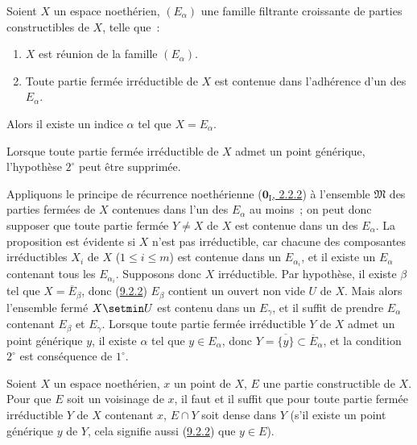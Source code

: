 \begin{corollary}[9.2.4]
\label{0.9.2.4-fr}
Soient $X$ un espace noethérien, $(E_\alpha)$ une famille filtrante
croissante de parties constructibles de $X$, telle que~:
\begin{enumerate}
  \item[$1^\circ$] $X$ est réunion de la famille $(E_\alpha)$.
  \item[$2^\circ$] Toute partie fermée irréductible de $X$ est contenue dans
    l'adhérence d'un des $E_\alpha$.
\end{enumerate}
Alors il existe un indice $\alpha$ tel que $X=E_\alpha$.

Lorsque toute partie fermée irréductible de $X$ admet un point générique,
l'hypothèse $2^\circ$ peut être supprimée.
\end{corollary}

Appliquons le principe de récurrence noethérienne
(\hyperref[0.2.2.2-fr]{$\mathbf{0}_{\mathrm I}$, 2.2.2}) à l'ensemble
$\mathfrak{M}$ des parties fermées de $X$ contenues dans l'un des $E_\alpha$
au moins~; on peut donc supposer que toute partie fermée $Y\ne X$ de $X$ est
contenue dans un des $E_\alpha$. La proposition est évidente si $X$ n'est pas
irréductible, car chacune des composantes irréductibles $X_i$ de $X$
($1\leq i\leq m$) est contenue dans un $E_{\alpha_i}$, et il existe un
$E_\alpha$ contenant tous les $E_{\alpha_i}$. Supposons donc $X$
irréductible. Par hypothèse, il existe $\beta$ tel que
$X=\overline{E}_\beta$, donc (\hyperref[0.9.2.2-fr]{9.2.2}) $E_\beta$
contient un ouvert non vide $U$ de $X$. Mais alors l'ensemble fermé
$X\setmin U$ est contenu dans un $E_\gamma$, et il suffit de prendre
$E_\alpha$ contenant $E_\beta$ et $E_\gamma$. Lorsque toute partie fermée
irréductible $Y$ de $X$
admet un point générique $y$, il existe $\alpha$ tel que $y\in E_\alpha$,
donc $Y=\overline{\{y\}}\subset\overline{E}_\alpha$, et la condition
$2^\circ$ est conséquence de $1^\circ$.

\begin{proposition}[9.2.5]
\label{0.9.2.5-fr}
Soient $X$ un espace noethérien, $x$ un point de $X$, $E$ une partie
constructible de $X$. Pour que $E$ soit un voisinage de $x$, il faut et il
suffit que pour toute partie fermée irréductible $Y$ de $X$ contenant $x$,
$E\cap Y$ soit dense dans $Y$ (s'il existe un point générique $y$ de $Y$,
cela signifie aussi \textup{(\hyperref[0.9.2.2-fr]{9.2.2})} que $y\in E$).
\end{proposition}

